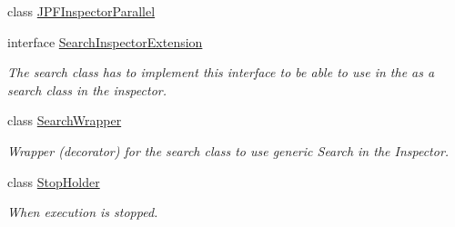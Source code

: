 \begin{DoxyCompactItemize}
class \hyperlink{classgov_1_1nasa_1_1jpf_1_1inspector_1_1server_1_1jpf_1_1_j_p_f_inspector_parallel}{J\+P\+F\+Inspector\+Parallel}
\item 
interface \hyperlink{interfacegov_1_1nasa_1_1jpf_1_1inspector_1_1server_1_1jpf_1_1_search_inspector_extension}{Search\+Inspector\+Extension}
\begin{DoxyCompactList}\small\item\em The search class has to implement this interface to be able to use in the as a search class in the inspector. \end{DoxyCompactList}\item 
class \hyperlink{classgov_1_1nasa_1_1jpf_1_1inspector_1_1server_1_1jpf_1_1_search_wrapper}{Search\+Wrapper}
\begin{DoxyCompactList}\small\item\em Wrapper (decorator) for the search class to use generic Search in the Inspector. \end{DoxyCompactList}\item 
class \hyperlink{classgov_1_1nasa_1_1jpf_1_1inspector_1_1server_1_1jpf_1_1_stop_holder}{Stop\+Holder}
\begin{DoxyCompactList}\small\item\em When execution is stopped. \end{DoxyCompactList}\end{DoxyCompactItemize}

